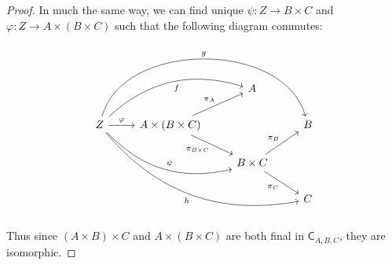 \documentclass{article}
\theoremstyle{definition}
\begin{document}
\begin{proof}
	In much the same way, we can find unique $\psi : Z \to B \times C$ and $\varphi: Z \to A \times (B \times C)$ such that the following diagram commutes: \begin{equation*}
		\begin{tikzcd}
			& & A \\
			Z \arrow[rrr, bend left = 75, "g"] \arrow[urr, bend left, "f"'] \arrow[r, "\varphi"] \arrow[drr, bend right, "\psi"] \arrow[ddrrr, bend right, "h"'] & A \times (B \times C) \arrow[ur, "\pi_A"] \arrow[dr, "\pi_{B \times C}"'] & & B \\
			& & B \times C \arrow[ur, "\pi_B"] \arrow[dr, "\pi_C"'] \\
			& & & C
		\end{tikzcd}
	\end{equation*}

	Thus since $(A \times B) \times C$ and $A \times (B \times C)$ are both final in $\mathsf{C}_{A, B, C}$, they are isomorphic.
\end{proof}
\end{document}
